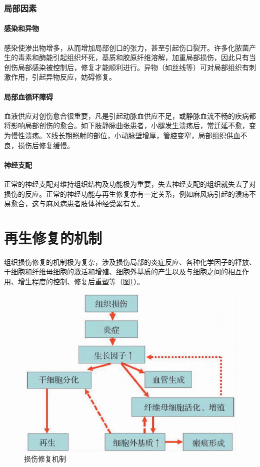 \subsubsection{局部因素}

\paragraph{感染和异物}
感染使渗出物增多，从而增加局部创口的张力，甚至引起伤口裂开。许多化脓菌产生的毒素和酶能引起组织坏死，基质和胶原纤维溶解，加重局部损伤，因此只有当创伤局部感染被控制后，修复才能顺利进行。异物（如丝线等）可对局部组织有刺激作用，引起异物反应，妨碍修复。

\paragraph{局部血循环障碍}
血液供应对创伤愈合很重要，凡是引起动脉血供应不足，或静脉血流不畅的疾病都将影响局部创伤的愈合。如下肢静脉曲张患者，小腿发生溃疡后，常迁延不愈，变为慢性溃疡。X线长期照射的部位，小动脉壁增厚，管腔变窄，局部组织供血不良，损伤后修复缓慢。

\paragraph{神经支配}
正常的神经支配对维持组织结构及功能极为重要，失去神经支配的组织就失去了对损伤的反应。正常的神经功能与再生修复亦有一定关系，例如麻风病引起的溃疡不易愈合，这与麻风病患者肢体神经受累有关。

\section{再生修复的机制}

组织损伤修复的机制极为复杂，涉及损伤局部的炎症反应、各种化学因子的释放、干细胞和纤维母细胞的激活和增殖、细胞外基质的产生以及与细胞之间的相互作用、增生程度的控制、修复后重塑等（图\ref{fig2-10}）。

\begin{figure}[!htbp]
	\centering
	\includegraphics{./images/Image00033.jpg}
	\caption{损伤修复机制}
	\label{fig2-10}
\end{figure}



